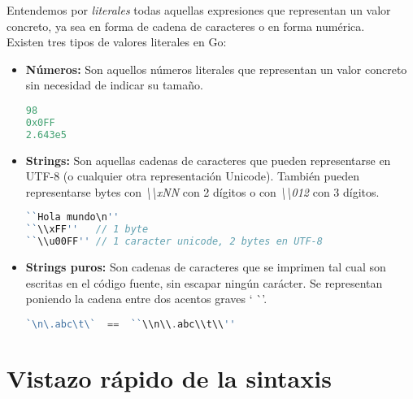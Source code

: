 Entendemos por \emph{literales} todas aquellas expresiones que representan un
valor concreto, ya sea en forma de cadena de caracteres o en forma numérica.\\

Existen tres tipos de valores literales en Go:

\begin{itemize}
	\item \textbf{Números:} Son aquellos números literales que representan un
	valor concreto sin necesidad de indicar su tamaño.
\begin{minipage}{17.1cm}
\begin{lstlisting}[language=go,numbers=none]
98
0x0FF
2.643e5
\end{lstlisting}
\end{minipage}

	\item \textbf{Strings:} Son aquellas cadenas de caracteres que pueden
	representarse en UTF-8 (o cualquier otra representación Unicode). También
	pueden representarse bytes con \emph{\textbackslash\textbackslash xNN} con
	2 dígitos o con \emph{\textbackslash\textbackslash 012} con 3 dígitos.

\begin{minipage}{17.1cm}
\begin{lstlisting}[language=go,numbers=none]
``Hola mundo\n''
``\\xFF''	// 1 byte
``\\u00FF''	// 1 caracter unicode, 2 bytes en UTF-8
\end{lstlisting}
\end{minipage}

	\item \textbf{Strings puros:} Son cadenas de caracteres que se imprimen tal
		cual son escritas en el código fuente, sin escapar ningún carácter. Se
		representan poniendo la cadena entre dos acentos graves ` \`\  '.

\begin{minipage}{17.1cm}
\begin{lstlisting}[language=go,numbers=none]
`\n\.abc\t\`  ==  ``\\n\\.abc\\t\\''
\end{lstlisting}
\end{minipage}
\end{itemize}

\section{Vistazo rápido de la sintaxis\label{sintaxis}}

